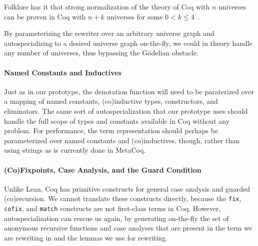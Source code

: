 \documentclass[sn-mathphys,pdflatex]{sn-jnl}%
\theoremstyle{thmstyleone}%
\theoremstyle{thmstyletwo}%
\theoremstyle{thmstylethree}%
\begin{document}
Folklore has it that strong normalization of the theory of Coq with $n$ universes can be proven in Coq with $n+k$ universes for some $0 < k \le 4$~\cite{pujet2023logrelmltt,westbrook2011uniform}.

By parameterizing the rewriter over an arbitrary universe graph and autospecializing to a desired universe graph on-the-fly, we could in theory handle any number of universes, thus bypassing the G\"odelian obstacle.

\paragraph{Named Constants and Inductives}
Just as in our prototype, the denotation function will need to be paraterized over a mapping of named constants, (co)inductive types, constructors, and eliminators.
The same sort of autospecialization that our prototype uses should handle the full scope of types and constants available in Coq without any problem.
For performance, the term representation should perhaps be parameterized over named constants and (co)inductives, though, rather than using strings as is currently done in MetaCoq.

\paragraph{(Co)Fixpoints, Case Analysis, and the Guard Condition}
Unlike Lean, Coq has primitive constructs for general case analysis and guarded (co)recursion.
We cannot translate these constructs directly, because the \texttt{fix}, \texttt{cofix}, and \texttt{match} constructs are not first-class terms in Coq.
However, autospecialization can rescue us again, by generating on-the-fly the set of anonymous recursive functions and case analyses that are present in the term we are rewriting in and the lemmas we use for rewriting.
\end{document}
